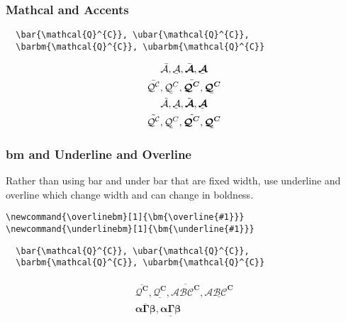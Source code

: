 \documentclass[12pt,english]{article}
\begin{document}
\subsubsection{Mathcal and Accents}

\begin{verbatim}
  \bar{\mathcal{Q}^{C}}, \ubar{\mathcal{Q}^{C}},
  \barbm{\mathcal{Q}^{C}}, \ubarbm{\mathcal{Q}^{C}}
\end{verbatim}
\begin{align}
    \begin{gathered}
      \bar{\mathcal{A}}, \ubar{\mathcal{A}},
      \barbm{\mathcal{A}}, \ubarbm{\mathcal{A}}\\
      \bar{\mathcal{Q}^{C}}, \ubar{\mathcal{Q}^{C}},
      \barbm{\mathcal{Q}^{C}}, \ubarbm{\mathcal{Q}^{C}}\\
      \tilde{\mathcal{A}}, \utilde{\mathcal{A}},
      \tildebm{\mathcal{A}}, \utildebm{\mathcal{A}}\\
      \tilde{\mathcal{Q}^{C}}, \utilde{\mathcal{Q}^{C}},
      \tildebm{\mathcal{Q}^{C}}, \utildebm{\mathcal{Q}^{C}}\\
    \end{gathered}
\end{align}

\subsubsection{bm and Underline and Overline}

Rather than using bar and under bar that are fixed width, use underline and overline which change width and can change in boldness.

\newcommand{\overlinebm}[1]{\bm{\overline{#1}}}
\newcommand{\underlinebm}[1]{\bm{\underline{#1}}}
\begin{verbatim}
\newcommand{\overlinebm}[1]{\bm{\overline{#1}}}
\newcommand{\underlinebm}[1]{\bm{\underline{#1}}}
\end{verbatim}

\begin{verbatim}
  \bar{\mathcal{Q}^{C}}, \ubar{\mathcal{Q}^{C}},
  \barbm{\mathcal{Q}^{C}}, \ubarbm{\mathcal{Q}^{C}}
\end{verbatim}
\begin{align}
    \begin{gathered}
      \overlinebm{\mathcal{Q}^{C}}, \underlinebm{\mathcal{Q}^{C}}, \overlinebm{\mathcal{ABC}^{C}}, \underlinebm{\mathcal{ABC}^{C}}\\
      \overlinebm{\alpha\Gamma\beta}, \underlinebm{\alpha\Gamma\beta}\\
    \end{gathered}
\end{align}
\end{document}
